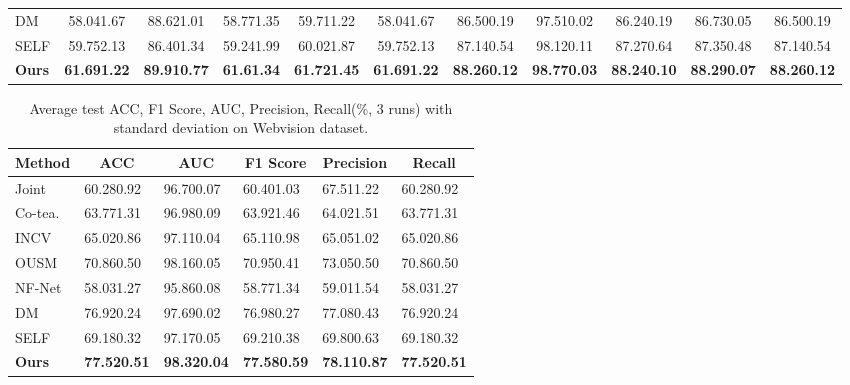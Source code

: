 \begin{table*}[]
\begin{tabular}{@{}lcccccccccc@{}}
DM                       & 58.041.67          & 88.621.01          & 58.771.35          & 59.711.22          & 58.041.67          & 86.500.19          & 97.510.02          & 86.240.19          & 86.730.05          & 86.500.19          \\
SELF                            & 59.752.13          & 86.401.34          & 59.241.99          & 60.021.87          & 59.752.13          & 87.140.54          & 98.120.11          & 87.270.64          & 87.350.48          & 87.140.54          \\
\textbf{Ours}                   & \textbf{61.691.22} & \textbf{89.910.77} & \textbf{61.61.34}  & \textbf{61.721.45} & \textbf{61.691.22} & \textbf{88.260.12} & \textbf{98.770.03} & \textbf{88.240.10} & \textbf{88.290.07} & \textbf{88.260.12} \\ \bottomrule
\end{tabular}
\end{table*}


\begin{table}[]
\scriptsize
\centering
\caption{{Average test ACC, F1 Score, AUC, {Precision}, Recall(\%, 3 runs) with standard deviation on Webvision dataset.}}
\label{table:objWebvision}
\begin{tabular}{@{}llllll@{}}
\toprule
Method & \multicolumn{1}{c}{ACC} & \multicolumn{1}{c}{AUC} & \multicolumn{1}{c}{F1 Score} & \multicolumn{1}{c}{{Precision}} & \multicolumn{1}{c}{Recall} \\ \midrule
Joint      & 60.280.92             & 96.700.07             & 60.401.03                  & 67.511.22             & 60.280.92                \\
Co-tea.      & 63.771.31             & 96.980.09             & 63.921.46                  & 64.021.51             & 63.771.31                \\
INCV             & 65.020.86             & 97.110.04             & 65.110.98                  & 65.051.02             & 65.020.86                \\
OUSM        & 70.860.50             & 98.160.05             & 70.950.41                  & 73.050.50             & 70.860.50                \\
NF-Net           & 58.031.27             & 95.860.08             & 58.771.34                  & 59.011.54             & 58.031.27                \\
DM        & 76.920.24             & 97.690.02             & 76.980.27                  & 77.080.43             & 76.920.24                \\
SELF             & 69.180.32             & 97.170.05             & 69.210.38                  & 69.800.63             & 69.180.32                \\
\textbf{Ours}    & \textbf{77.520.51}    & \textbf{98.320.04}    & \textbf{77.580.59}         & \textbf{78.110.87}    & \textbf{77.520.51}       \\ \bottomrule
\end{tabular}
\end{table}

